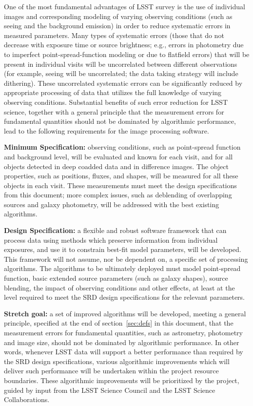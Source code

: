 One of the most fundamental advantages of LSST survey is the use of individual
images and corresponding modeling of varying observing conditions (such as seeing
and the background emission) in order to reduce systematic errors in measured
parameters.  Many types of systematic errors (those that do not decrease with
exposure time or source brightness; e.g., errors in photometry due to imperfect
point-spread-function modeling or due to flatfield errors) that will be present in
individual visits will be uncorrelated between different observations (for example,
seeing will be uncorrelated; the data taking strategy will include dithering). These
uncorrelated systematic errors can be significantly reduced by appropriate processing
of data that utilizes the full knowledge of varying observing conditions. Substantial
benefits of such error reduction for LSST science,  together with a general principle
that the measurement errors for fundamental quantities should not be dominated
by algorithmic performance, lead to the following requirements for the image
processing software.

\textbf{Minimum Specification:} observing conditions, such as point-spread function and
background level, will be evaluated and known for each visit, and for all objects
detected in deep coadded data and in difference images. The object properties,
such as positions, fluxes, and shapes, will be measured for all these objects in
each visit. These measurements must meet the design specifications from this
document; more complex issues, such as deblending of overlapping sources
and galaxy photometry, will be addressed with the best existing algorithms.

\textbf{Design Specification:} a flexible and robust software framework that can process
data using methods which preserve information from individual exposures, and
use it to constrain best-fit model parameters, will be developed.
This framework will not assume, nor be dependent on, a specific
set of processing algorithms. The algorithms to be ultimately deployed must model
point-spread function, basic extended source parameters (such as galaxy shapes),
source blending, the impact of observing conditions and other effects, at least at
the level required to meet the SRD design specifications for the relevant parameters.

\textbf{Stretch goal:} a set of improved algorithms will be developed, meeting a general principle,
specified at the end of section~\ref{sec:defs} in this document, that the measurement errors for
fundamental quantities, such as astrometry, photometry and image size, should not be dominated
by algorithmic performance. In other words, whenever LSST data
will support a better performance than required by the SRD design specifications,
various algorithmic improvements which will deliver such performance will be
undertaken within the project resource boundaries. These algorithmic improvements
will be prioritized by the project, guided by input from the
LSST Science Council and the LSST Science Collaborations.

